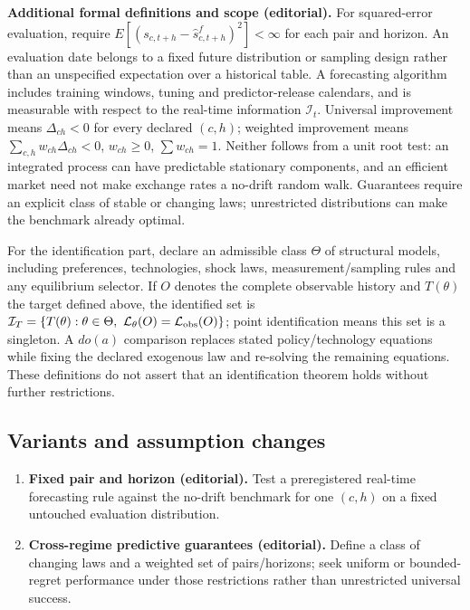 \documentclass[11pt,a4paper]{article}
\begin{document}
\textbf{Additional formal definitions and scope (editorial).} For squared-error evaluation, require \(E[(s_{c,t+h}-\widehat s^f_{c,t+h})^2]<\infty\) for each pair and horizon. An evaluation date belongs to a fixed future distribution or sampling design rather than an unspecified expectation over a historical table. A forecasting algorithm includes training windows, tuning and predictor-release calendars, and is measurable with respect to the real-time information \(\mathcal I_t\). Universal improvement means \(\Delta_{ch}<0\) for every declared \((c,h)\); weighted improvement means \(\sum_{c,h}w_{ch}\Delta_{ch}<0\), \(w_{ch}\geq0\), \(\sum w_{ch}=1\). Neither follows from a unit root test: an integrated process can have predictable stationary components, and an efficient market need not make exchange rates a no-drift random walk. Guarantees require an explicit class of stable or changing laws; unrestricted distributions can make the benchmark already optimal.

For the identification part, declare an admissible class \(\Theta\) of structural models, including preferences, technologies, shock laws, measurement/sampling rules and any equilibrium selector. If \(O\) denotes the complete observable history and \(T(\theta)\) the target defined above, the identified set is \(\mathcal I_T=\{T(\theta):\theta\in\Theta,\ \mathcal L_\theta(O)=\mathcal L_{\rm obs}(O)\}\); point identification means this set is a singleton. A \(do(a)\) comparison replaces stated policy/technology equations while fixing the declared exogenous law and re-solving the remaining equations. These definitions do not assert that an identification theorem holds without further restrictions.
\subsection*{Variants and assumption changes}
\begin{enumerate}
\item \textbf{Fixed pair and horizon (editorial).} Test a preregistered real-time forecasting rule against the no-drift benchmark for one \((c,h)\) on a fixed untouched evaluation distribution.
\item \textbf{Cross-regime predictive guarantees (editorial).} Define a class of changing laws and a weighted set of pairs/horizons; seek uniform or bounded-regret performance under those restrictions rather than unrestricted universal success.
\end{enumerate}
\end{document}
